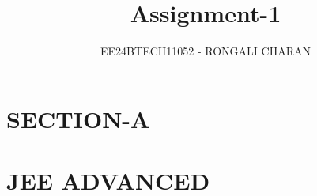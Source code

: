 \documentclass[journal,12pt,twocolumn]{IEEEtran}
\theoremstyle{remark}
\begin{document}

\vspace{3cm}

\title{\textbf{Assignment-1}}
\author{EE24BTECH11052 - RONGALI CHARAN}
\maketitle
\bigskip

\renewcommand{\thefigure}{\theenumi}
\renewcommand{\thetable}{\theenumi}
\onecolumn
\setlength{\columnsep}{2.5em}
\section*{\textbf{SECTION-A}}
\section*{\textbf{JEE ADVANCED}}
\end{document}
